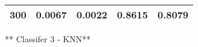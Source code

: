 \documentclass{ctexart}
\begin{document}
\begin{longtable}[]{@{}ccccc@{}}
\begin{minipage}[t]{0.16\columnwidth}\centering\strut
300\strut
\end{minipage} & \begin{minipage}[t]{0.21\columnwidth}\centering\strut
0.0067\strut
\end{minipage} & \begin{minipage}[t]{0.20\columnwidth}\centering\strut
0.0022\strut
\end{minipage} & \begin{minipage}[t]{0.15\columnwidth}\centering\strut
0.8615\strut
\end{minipage} & \begin{minipage}[t]{0.14\columnwidth}\centering\strut
0.8079\strut
\end{minipage}\tabularnewline
\bottomrule
\end{longtable}

** Classifer 3 - KNN**
\end{document}
